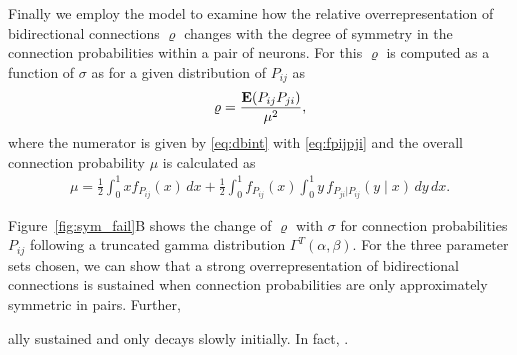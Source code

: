 Finally we employ the model to examine how the relative overrepresentation of bidirectional connections $\varrho$ changes with the degree of symmetry in the connection probabilities within a pair of neurons. For this $\varrho$ is computed as a function of $\sigma$ as for a given distribution of $P_{ij}$ as
%
\begin{align}
  \varrho = \frac{\operatorname{\mathbf{E}}(P_{ij} P_{ji})}{\mu^2}, \label{eq:rho_sigma}
\end{align}
%
where the numerator is given by \eqref{eq:dbint} with %
\eqref{eq:fpijpji} %
%
%
and the overall connection probability $\mu$ is calculated as
%
\begin{align}
 \mu = \frac{1}{2} \int_0^1 x f_{P_{ij}}(x)\,dx + \frac{1}{2} \int_0^1 f_{P_{ij}}(x) \int_0^1 y \,f_{P_{ji}\vert P_{ij}}(y \mid x) \,dy \, dx.
\end{align}
%

Figure~\ref{fig:sym_fail}B shows the change of $\varrho$ with $\sigma$ for connection probabilities $P_{ij}$ following a truncated gamma distribution $\Gamma^T(\alpha, \beta)$. For the three parameter sets chosen, we can show that a strong overrepresentation of bidirectional connections is sustained when connection probabilities are only approximately symmetric in pairs. Further, 

ally sustained and only decays slowly initially. In fact, . 

